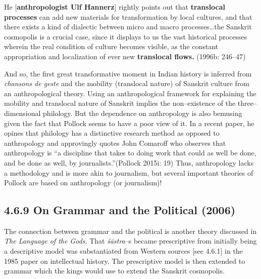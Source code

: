 \begin{myquote}
He [\textbf{anthropologist Ulf Hannerz}] rightly points out that \textbf{translocal processes} can add new materials for transformation by local cultures, and that there exists a kind of dialectic between micro and macro processes…the Sanskrit cosmopolis is a crucial case, since it displays to us the vast historical processes wherein the real condition of culture becomes visible, as the constant appropriation and localization of ever new \textbf{translocal flows.} (1996b: 246–47)
\end{myquote}

And so, the first great transformative moment in Indian history is inferred from\textit{ chansons de geste} and the mobility (translocal nature) of Sanskrit culture from an anthropological theory. Using an anthropological framework for explaining the mobility and translocal nature of Sanskrit implies the non–existence of the three–dimensional philology. But the dependence on anthropology is also bemusing given the fact that Pollock seems to have a poor view of it. In a recent paper, he opines that philology has a distinctive research method as opposed to anthropology and approvingly quotes John Comaroff who observes that anthropology is “a discipline that takes to doing work that could as well be done, and be done as well, by journalists.”(Pollock 2015i: 19) Thus, anthropology lacks a methodology and is more akin to journalism, but several important theories of Pollock are based on anthropology (or journalism)!


\subsection*{4.6.9 On Grammar and the Political (2006)}

\vspace{-.3cm}

The connection between grammar and the political is another theory discussed in \textit{The Language of the Gods}. That \textit{śāstra}–s became prescriptive from initially being a descriptive model was substantiated from Western sources [see 4.6.1] in the 1985 paper on intellectual history. The prescriptive model is then extended to grammar which the kings would use to extend the Sanskrit cosmopolis.

